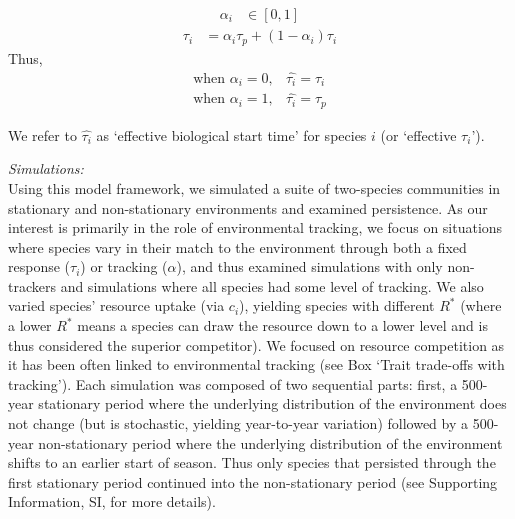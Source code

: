 \documentclass[11pt,letterpaper]{article}
\begin{document}
\begin{linenomath}
\begin{align*}
\alpha_{i} & \in [0, 1]  
\end{align*}
\begin{align}
\hat{\tau_{i}} & = \alpha_{i} \tau_{p} + (1-\alpha_{i})\tau_{i}
\end{align}
\noindent Thus, 
\begin{align*}
\text{when } \alpha_{i} = 0, & \hat{\tau_{i}}=\tau_{i}\\
\text{when }  \alpha_{i} = 1, & \hat{\tau_{i}}=\tau_{p}
\end{align*}
\end{linenomath}
We refer to $\hat{\tau_{i}}$ as `effective biological start time' for species $i$ (or `effective $\tau_i$'). 

\noindent \emph{Simulations:}\\
Using this model framework, we simulated a suite of two-species communities in stationary and non-stationary environments and examined persistence. As our interest is primarily in the role of environmental tracking, we focus on situations where species vary in their match to the environment through both a fixed response ($\tau_i$) or tracking ($\alpha$), and thus examined simulations with only non-trackers and simulations where all species had some level of tracking. We also varied species' resource uptake (via $c_i$), yielding species with different $R^*$ (where a lower $R^*$ means a species can draw the resource down to a lower level and is thus considered the superior competitor). We focused on resource competition as it has been often linked to environmental tracking (see Box `Trait trade-offs with tracking'). Each simulation was composed of two sequential parts: first, a 500-year stationary period where the underlying distribution of the environment does not change (but is stochastic, yielding year-to-year variation) followed by a 500-year non-stationary period where the underlying distribution of the environment shifts to an earlier start of season. Thus only species that persisted through the first stationary period continued into the non-stationary period (see Supporting Information, SI, for more details).  %
\end{document}
